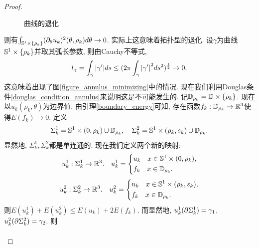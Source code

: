 \begin{proof}
\begin{claim}
\begin{subproof}
\begin{figure}[!h]
                \caption{曲线的退化}
                \label{closed_degenerate}
            \end{figure}
            则有$\int_{\S^1\times \{\rho_k\}} (\PTT{u_k})^2(\theta,\rho_k) d\theta  \to 0$. 实际上这意味着拓扑型的退化. 设$\gamma$为曲线$\S^1 \times \{\rho_k\}$并取其弧长参数, 则由Cauchy不等式,
            \begin{equation}
                l_\gamma = \int_\gamma\abs{\gamma'}ds \le (2\pi\int_\gamma \abs{\gamma'}^2ds^2)^\rec{2} \to 0.
            \end{equation}
            这意味着出现了图\eqref{figure_annulus_minimizing}中的情况.  现在我们利用Douglas条件\eqref{douglas_condition_annulus}来说明这是不可能发生的.
            记$\D_{\rho_k}=\D \times \{\rho_k\}$. 现在以$u_k(\rho_k,\theta)$为边界值, 由引理\eqref{boundary_energy}可知, 存在函数$f_k: \D_{\rho_k} \to \R^3$使得$E(f_k) \to 0$.  定义
            \begin{equation}
                \Sigma^1_k= \S^1 \times (0,\rho_k) \cup \D_{\rho_k},\s \Sigma^2_k=\S^1\times (\rho_k,s_k) \cup \D_{\rho_k}.
            \end{equation}
            显然地, $\Sigma^1_k, \Sigma^2_k$都是单连通的. 现在我们定义两个新的映射:
            \begin{equation}
                {u}_k^1: \Sigma^1_k \to \R^3.  \s  {u}_k^1=\left\{
                    \begin{aligned}
                        &u_k\s x \in \S^1 \times (0,\rho_k),\\
                        &f_k\s x \in \D_{\rho_k}.
                    \end{aligned}
                \right.
            \end{equation}
            \begin{equation}
                {u}_k^2: \Sigma^2_k \to \R^3.  \s  {u}_k^2=\left\{
                    \begin{aligned}
                        &u_k\s x \in \S^1 \times (\rho_k, s_k),\\
                        &f_k\s x \in \D_{\rho_k}.
                    \end{aligned}
                \right.
            \end{equation}
            则$E({u}_k^1)+E({u}_k^2) \le E(u_k)+2E(f_k)$. 而显然地, ${u}_k^1(\P \Sigma^1_k) = \gamma_1$,${{u}}_k^2(\P \Sigma^2_k)= \gamma_2$. 则
            \begin{equation}
                \begin{split}

\end{split}
\end{equation}
\end{subproof}
\end{claim}
\end{proof}
